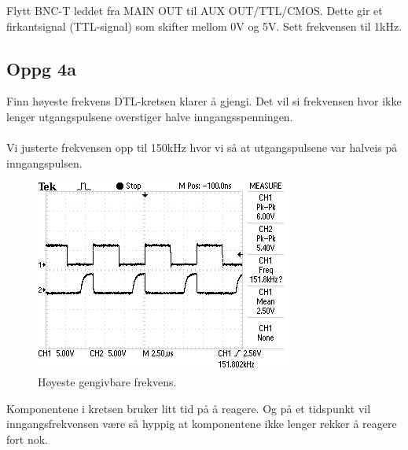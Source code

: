 Flytt BNC-T leddet fra MAIN OUT til AUX OUT/TTL/CMOS.
Dette gir et firkantsignal (TTL-signal) som skifter mellom 0V og 5V.
Sett frekvensen til 1kHz.



\subsection{Oppg 4a}
Finn høyeste frekvens DTL-kretsen klarer å gjengi.
Det vil si frekvensen hvor ikke lenger utgangspulsene overstiger
halve inngangsspenningen.
\\\\
Vi justerte frekvensen opp til 150kHz hvor vi så at utgangspulsene var halveis
på inngangspulsen.
\begin{figure}[!ht]
  \caption{Høyeste gengivbare frekvens.}
  \centering
    \includegraphics[width=\textwidth]{4a.jpg}
\end{figure}
Komponentene i kretsen bruker litt tid på å reagere.
Og på et tidspunkt vil inngangsfrekvensen være så hyppig at komponentene
ikke lenger rekker å reagere fort nok.



